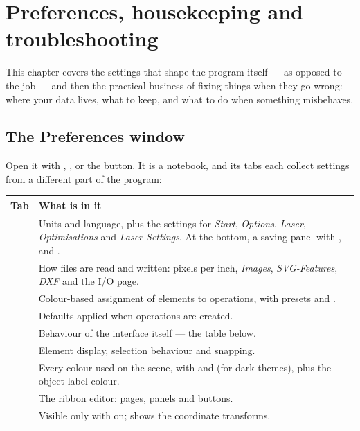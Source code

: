 \chapter{Preferences, housekeeping and troubleshooting}
\label{ch:prefs}

This chapter covers the settings that shape the program itself --- as opposed to
the job --- and then the practical business of fixing things when they go wrong:
where your data lives, what to keep, and what to do when something misbehaves.

\section{The Preferences window}

Open it with , , or the
 button. It is a notebook, and its tabs each collect settings
from a different part of the program:

\begin{center}\small
\begin{tabular}{@{}L{2.7cm}L{11.5cm}@{}}
\toprule
\textbf{Tab} & \textbf{What is in it} \\
\midrule
{} & Units and language, plus the settings for \emph{Start},
\emph{Options}, \emph{Laser}, \emph{Optimisations} and \emph{Laser Settings}. At
the bottom, a saving panel with ,  and . \\
 & How files are read and written: pixels per inch,
\emph{Images}, \emph{SVG-Features}, \emph{DXF} and the I/O page. \\
 & Colour-based assignment of elements to operations,
with presets  and . \\
 & Defaults applied when operations are created. \\
 & Behaviour of the interface itself --- the table below. \\
 & Element display, selection behaviour and snapping. \\
 & Every colour used on the scene, with  and  (for dark themes), plus the
object-label colour. \\
 & The ribbon editor: pages, panels and buttons. \\
 & Visible only with  on; shows the
coordinate transforms. \\
\bottomrule
\end{tabular}
\end{center}

